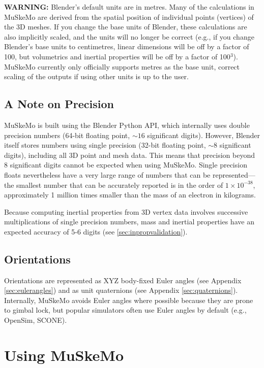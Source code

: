 \documentclass{article}
\begin{document}
\textbf{WARNING:} Blender's default units are in metres. Many of the calculations in MuSkeMo are derived from the spatial position of individual points (vertices) of the 3D meshes. If you change the base units of Blender, these calculations are also implicitly scaled, and the units will no longer be correct (e.g., if you change Blender's base units to centimetres, linear dimensions will be off by a factor of 100, but volumetrics and inertial properties will be off by a factor of 100\(^3\)). MuSkeMo currently only officially supports metres as the base unit, correct scaling of the outputs if using other units is up to the user.

\subsection{A Note on Precision}
\label{sec:precision}

MuSkeMo is built using the Blender Python API, which internally uses double precision numbers (64-bit floating point, \(\sim16\) significant digits). However, Blender itself stores numbers using single precision (32-bit floating point, \(\sim8\) significant digits), including all 3D point and mesh data. This means that precision beyond 8 significant digits cannot be expected when using MuSkeMo. Single precision floats nevertheless have a very large range of numbers that can be represented—the smallest number that can be accurately reported is in the order of \(1\times10^{-38}\), approximately 1 million times smaller than the mass of an electron in kilograms.

Because computing inertial properties from 3D vertex data involves successive multiplications of single precision numbers, mass and inertial properties have an expected accuracy of 5-6 digits (see \ref{sec:inpropvalidation}).

\subsection{Orientations}

Orientations are represented as XYZ body-fixed Euler angles (see Appendix \ref{sec:eulerangles}) and as unit quaternions (see Appendix \ref{sec:quaternions}). Internally, MuSkeMo avoids Euler angles where possible because they are prone to gimbal lock, but popular simulators often use Euler angles by default (e.g., OpenSim, SCONE).


\section{Using MuSkeMo}
\end{document}
